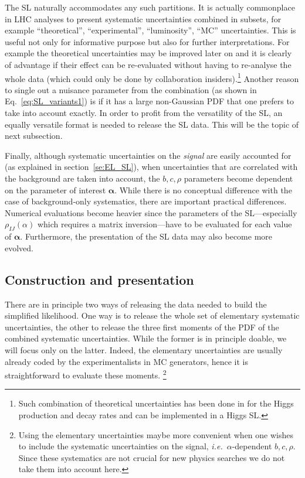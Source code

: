 \documentclass[11pt]{article}
\def\ie{{\it i.e.}}
\begin{document}
The SL naturally accommodates any such partitions. It is actually  commonplace in LHC analyses   to present systematic uncertainties combined in subsets, for example ``theoretical'', ``experimental'', ``luminosity'', ``MC'' uncertainties. 
This is useful not only for informative purpose but also for further interpretations. 
For example the theoretical uncertainties may be improved later on 
and it is clearly of advantage if their effect can be re-evaluated without having to re-analyse the whole data (which could only be done by collaboration insiders).\footnote{Such combination of theoretical uncertainties  has been done in \cite{Arbey:2016kqi}  for the Higgs production and decay rates and can be implemented in a Higgs SL.}
Another reason to single out a nuisance parameter  from the combination (as shown in Eq.~\eqref{eq:SL_variants1})
is if it has a large non-Gaussian PDF that one prefers to take into account exactly.
In order to profit from the  versatility of the SL, an equally  versatile format is needed to release the SL data. This will be the topic of next subsection.

Finally, although systematic uncertainties on the \textit{signal} are easily accounted for (as explained in section~\ref{se:EL_SL}), when uncertainties that are correlated with the background are taken into account, the $b,c,\rho$ parameters  become dependent on the parameter of interest ${\bm \alpha}$. While there is no conceptual difference with the case  of background-only systematics, there are important practical differences. Numerical evaluations  become heavier  since  the parameters of the SL---especially $\rho_{IJ}(\alpha)$ which requires a matrix inversion---have to be evaluated for each value of ${\bm \alpha}$. Furthermore, the presentation of the SL data may also become more evolved.

\subsection{Construction and  presentation}


There are in principle two ways of releasing the data needed to build the simplified likelihood. One way %
is to release the whole set of elementary systematic uncertainties, the other to release the three first moments of the PDF of the combined systematic uncertainties. While the former is in principle doable, we will focus only on the latter. Indeed, the elementary uncertainties are usually already  coded by the experimentalists in MC generators, hence it is straightforward to evaluate these moments.%
\footnote{Using the elementary uncertainties maybe more convenient when one wishes to include the systematic uncertainties on the signal, \ie\  $\alpha$-dependent $b,c,\rho$. Since these systematics are not crucial for new physics searches we do not take them into account here.}
\end{document}
